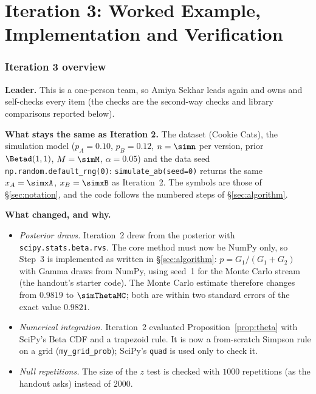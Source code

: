 \clearpage
\part*{Iteration 3: Worked Example, Implementation and Verification}

\section{Iteration 3 overview}\label{sec:it3-overview}

\textbf{Leader.} This is a one-person team, so Amiya Sekhar leads again and owns and self-checks every item
(the checks are the second-way checks and library comparisons reported below).

\textbf{What stays the same as Iteration 2.} The dataset (Cookie Cats), the simulation model
($p_A=0.10$, $p_B=0.12$, $n=\simn$ per version, prior $\Betad(1,1)$, $M=\simM$, $\alpha=0.05$) and the data seed
\texttt{np.random.default\_rng(0)}: \texttt{simulate\_ab(seed=0)} returns the same $x_A=\simxA$, $x_B=\simxB$ as Iteration~2.
The symbols are those of \S\ref{sec:notation}, and the code follows the numbered steps of \S\ref{sec:algorithm}.

\textbf{What changed, and why.}
\begin{itemize}[nosep]
\item \emph{Posterior draws.} Iteration~2 drew from the posterior with \texttt{scipy.stats.beta.rvs}. The core method
  must now be NumPy only, so Step~3 is implemented as written in \S\ref{sec:algorithm}: $p=G_1/(G_1+G_2)$ with
  Gamma draws from NumPy, using seed~1 for the Monte Carlo stream (the handout's starter code). The Monte Carlo
  estimate therefore changes from $0.9819$ to $\simThetaMC$; both are within two standard errors of the exact value $0.9821$.
\item \emph{Numerical integration.} Iteration~2 evaluated Proposition~\ref{prop:theta} with SciPy's Beta CDF and a
  trapezoid rule. It is now a from-scratch Simpson rule on a grid (\texttt{my\_grid\_prob}); SciPy's \texttt{quad} is used only to check it.
\item \emph{Null repetitions.} The size of the $z$ test is checked with $1000$ repetitions (as the handout asks) instead of $2000$.
\end{itemize}

